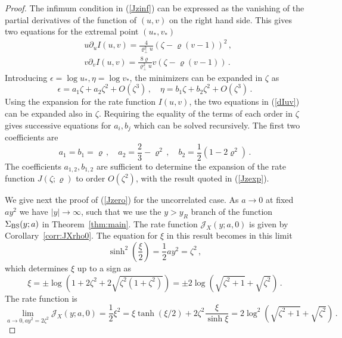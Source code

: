 \documentclass[11pt]{article}
\numberwithin{equation}{section}
\theoremstyle{plain}
\begin{document}
\begin{proof}
The infimum condition in (\ref{Jzinf}) can be expressed as the
vanishing of the partial derivatives of the function of $(u,v)$ on the
right hand side. This gives two equations for the extremal point
$(u_*,v_*)$
\begin{align}\label{dIuv}
& u \partial_u I(u,v) = \frac{4}{\varrho^2_\perp u}
\left(\zeta -\varrho (v-1)\right)^2\,,\\
& v \partial_v I(u,v) = \frac{8\varrho}{\varrho^2_\perp u}
v \left(\zeta -\varrho (v-1)\right) \,.
\nonumber
\end{align}
Introducing $\epsilon = \log u_*, \eta = \log v_*$, the
minimizers can be expanded in $\zeta$ as
\begin{equation}
\epsilon = a_1 \zeta + a_2 \zeta^2 + O(\zeta^3)\,,\quad
\eta = b_1 \zeta + b_2 \zeta^2 + O(\zeta^3) \,.
\end{equation}
Using the expansion for the rate function $I(u,v)$, 
the two equations in (\ref{dIuv}) can be expanded also in $\zeta$. Requiring
the equality of the terms of each order in $\zeta$ gives successive
equations for $a_i,b_j$ which can be solved recursively. The first two
coefficients are
\begin{equation}
a_1=b_1=\varrho\,,\quad 
a_2 = \frac23 - \varrho^2 \,,\quad
b_2 = \frac12(1-2\varrho^2) \,.
\end{equation}
The coefficients $a_{1,2},b_{1,2}$ are sufficient to 
determine the expansion of the rate function $J(\zeta;\varrho)$
to order $O(\zeta^2)$, with the result quoted in (\ref{Jzexp}).

We give next the proof of (\ref{Jzero}) for the uncorrelated case.
As $a\to 0$ at fixed $ay^2$
we have $|y|\to \infty$, such that we use the $y>y_R$ branch
of the function $\Sigma_{\rm BS}(y;a)$ in Theorem~\ref{thm:main}. 
The rate function $\mathcal{J}_X(y;a,0)$ is given by Corollary~\ref{corr:JXrho0}.
The equation for $\xi$ in this result becomes in this limit
\begin{equation}
\sinh^2 \left(\frac{\xi}{2}\right) = \frac12 ay^2 = \zeta^2\,,
\end{equation}
which determines $\xi$ up to a sign as
\begin{equation}
\xi = \pm \log\left(1 + 2\zeta^2 + 2\sqrt{\zeta^2(1+\zeta^2)}\right) = 
\pm 2 \log\left(\sqrt{\zeta^2+1} + \sqrt{\zeta^2}\right)\,.
\end{equation}
The rate function is
\begin{equation}
\lim_{a\to 0, ay^2 = 2\zeta^2} \mathcal{J}_X(y;a,0) = \frac12 \xi^2 
=\xi \tanh(\xi/2) + 2\zeta^2 \frac{\xi}{\sinh \xi} = 
2\log^2\left(\sqrt{\zeta^2+1} + \sqrt{\zeta^2}\right)\,.
\end{equation}
\end{proof}
\end{document}
